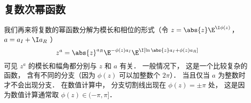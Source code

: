 
\begin{issues}
\issueDraft
\issueTODO
\end{issues}



\subsection{复数次幂函数}
我们再来将复数的幂函数分解为模长和相位的形式（令 $z = \abs{z} \E^{\I\phi(z)}$， $a = a_I + \I a_R$ ）
\begin{equation}
z^a = \abs{z}^{a_R} \E^{-\phi(z) a_I} \E^{\I[\ln\abs{z}a_I + \phi(z)a_R]}
\end{equation}
可见 $z^a$ 的模长和幅角都分别与 $z$ 和 $a$ 有关． 一般情况下， 这是一个比较复杂的函数， 含有不同的分支（因为 $\phi(z)$ 可以加整数个 $2\pi$）．%
当且仅当 $a$ 为整数时才不会出现分支． 在数值计算中， 分支切割线出现在 $\phi(z) = \pm\pi$ 处， 这是因为数值计算通常取 $\phi(z)\in(-\pi, \pi]$．
